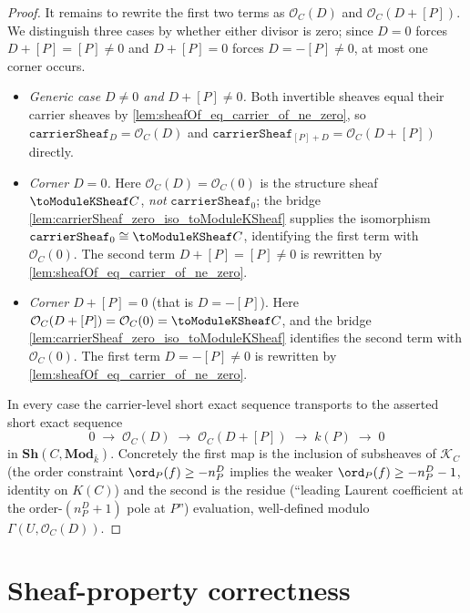 \begin{proof}
  It remains to rewrite the first two terms as \(\mathcal O_C(D)\) and
  \(\mathcal O_C(D+[P])\). We distinguish three cases by whether either divisor
  is zero; since \(D = 0\) forces \(D + [P] = [P] \neq 0\) and \(D + [P] = 0\)
  forces \(D = -[P] \neq 0\), at most one corner occurs.
  \begin{itemize}
    \item \emph{Generic case \(D \neq 0\) and \(D + [P] \neq 0\).} Both invertible
      sheaves equal their carrier sheaves by
      \cref{lem:sheafOf_eq_carrier_of_ne_zero}, so
      \(\texttt{carrierSheaf}_D = \mathcal O_C(D)\) and
      \(\texttt{carrierSheaf}_{[P]+D} = \mathcal O_C(D+[P])\) directly.
    \item \emph{Corner \(D = 0\).} Here \(\mathcal O_C(D) = \mathcal O_C(0)\) is
      the structure sheaf \(\toModuleKSheaf C\), \emph{not}
      \(\texttt{carrierSheaf}_0\); the bridge
      \cref{lem:carrierSheaf_zero_iso_toModuleKSheaf} supplies the isomorphism
      \(\texttt{carrierSheaf}_0 \cong \toModuleKSheaf C\), identifying the first
      term with \(\mathcal O_C(0)\). The second term \(D + [P] = [P] \neq 0\) is
      rewritten by \cref{lem:sheafOf_eq_carrier_of_ne_zero}.
    \item \emph{Corner \(D + [P] = 0\)} (that is \(D = -[P]\)). Here
      \(\mathcal O_C(D+[P]) = \mathcal O_C(0) = \toModuleKSheaf C\), and the
      bridge \cref{lem:carrierSheaf_zero_iso_toModuleKSheaf} identifies the
      second term with \(\mathcal O_C(0)\). The first term \(D = -[P] \neq 0\) is
      rewritten by \cref{lem:sheafOf_eq_carrier_of_ne_zero}.
  \end{itemize}
  In every case the carrier-level short exact sequence transports to the
  asserted short exact sequence
  \[
    0 \;\longrightarrow\; \mathcal O_C(D)
    \;\longrightarrow\; \mathcal O_C(D + [P])
    \;\longrightarrow\; k(P)
    \;\longrightarrow\; 0
  \]
  in \(\mathbf{Sh}(C, \mathbf{Mod}_{\bar k})\). Concretely the first map is
  the inclusion of subsheaves of \(\mathcal K_C\) (the order constraint
  \(\ord_P(f) \geq -n_P^{D}\) implies the weaker
  \(\ord_P(f) \geq -n_P^{D} - 1\), identity on \(K(C)\)) and the second is
  the residue (``leading Laurent coefficient at the order-\((n_P^{D}+1)\)
  pole at \(P\)'') evaluation, well-defined modulo
  \(\Gamma(U, \mathcal O_C(D))\).
\end{proof}

\section{Sheaf-property correctness}
\label{sec:sheaf-property-correctness}

